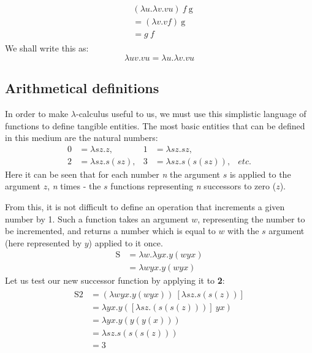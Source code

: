 \documentclass[Master.tex]{subfiles}
\begin{document}
\begin{gather*}
\begin{aligned}
&(\lambda u.\lambda v. vu)\ f\ \mathrm{g}\\
&= (\lambda v.vf)\ \mathrm{g}\\
&= g\ f
\end{aligned}
\end{gather*}
We shall write this as:
\begin{equation*}
\lambda uv.vu = \lambda u.\lambda v. vu
\end{equation*}

\subsection{Arithmetical definitions}

In order to make $\lambda$-calculus useful to us, we must use this simplistic language of functions to define tangible entities. The most basic entities that can be defined in this medium are the natural numbers:
\cite{church1941lambda}
\begin{equation*}
\begin{aligned}
\bm{\mathrm{0}} &= \lambda sz.z,
  & %
\bm{\mathrm{1}} &= \lambda sz.sz,
  \\
\bm{\mathrm{2}} &= \lambda sz.s(sz),
  &
\bm{\mathrm{3}} &= \lambda sz.s(s(sz)),
  &
etc.
\end{aligned}
\end{equation*}
Here it can be seen that for each number \textit{n} the argument $s$ is applied to the argument $z$, \textit{n} times - the $s$ functions representing \textit{n} successors to zero ($z$).

From this, it is not difficult to define an operation that increments a given number by 1. Such a function takes an argument $w$, representing the number to be incremented, and returns a number which is equal to $w$ with the $s$ argument (here represented by $y$) applied to it once.
\cite{rojas2015lambdatutorial}
\begin{equation*}
\begin{aligned}
\bm{\mathrm{S}} &= \lambda w.\lambda yx.y(wyx)\\
&= \lambda wyx.y(wyx)
\end{aligned}
\end{equation*}
Let us test our new successor function by applying it to \textbf{2}:
\begin{gather*}
\begin{aligned}
\bm{\mathrm{S2}} &= (\lambda wyx.y(wyx))\ [\lambda sz.s(s(z))]\\
&= \lambda yx.y([\lambda sz.(s(s(z)))]\ yx)\\
&= \lambda yx.y(y(y(x)))\\
&= \lambda sz.s(s(s(z)))\\
&= \bm{\mathrm{3}}
\end{aligned}
\end{gather*}
\end{document}
